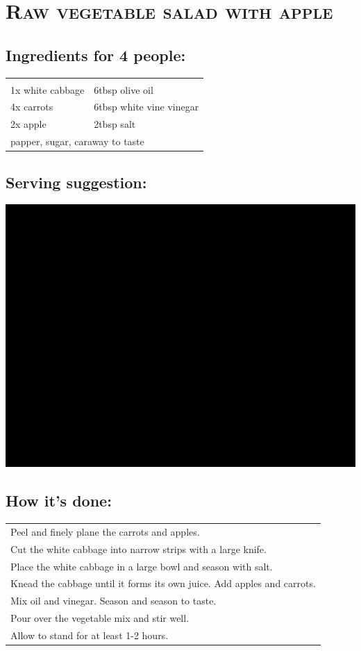 \section{\textsc{Raw vegetable salad with apple}}

\subsection*{Ingredients for 4 people:}

\begin{tabular}{p{7.5cm} p{7.5cm}}
	& \\
	1x white cabbage & 6tbsp olive oil \\
	4x carrots & 6tbsp white vine vinegar \\
	2x apple & 2tbsp salt \\
	\multicolumn{2}{l}{papper, sugar, caraway to taste}
\end{tabular}

\subsection*{Serving suggestion:}

\includegraphics[width=\textwidth]{img/ph.jpg} \cite{rohkostapfel}

\subsection*{How it's done:}

\begin{tabular}{p{15cm}}
	\\
  Peel and finely plane the carrots and apples.\\
  Cut the white cabbage into narrow strips with a large knife.\\
  Place the white cabbage in a large bowl and season with salt.\\
  Knead the cabbage until it forms its own juice. Add apples and carrots.\\
  Mix oil and vinegar. Season and season to taste.\\
  Pour over the vegetable mix and stir well.\\
  Allow to stand for at least 1-2 hours.
\end{tabular}
